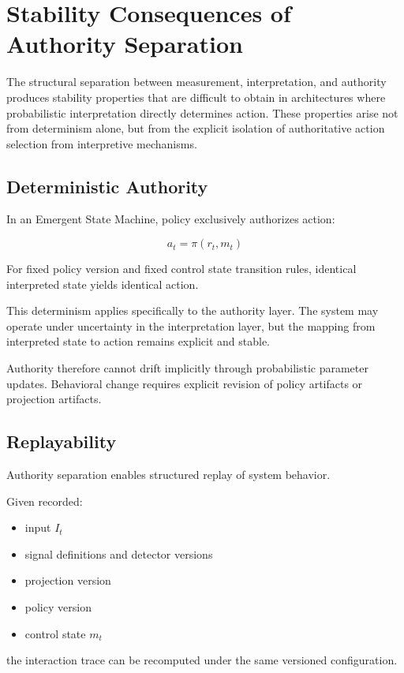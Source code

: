 \documentclass[11pt]{article}
\begin{document}
\section{Stability Consequences of Authority Separation}

The structural separation between measurement, interpretation, and authority produces stability properties that are difficult to obtain in architectures where probabilistic interpretation directly determines action. These properties arise not from determinism alone, but from the explicit isolation of authoritative action selection from interpretive mechanisms.

\subsection{Deterministic Authority}

In an Emergent State Machine, policy exclusively authorizes action:

\[
a_t = \pi(r_t, m_t)
\]

For fixed policy version and fixed control state transition rules, identical interpreted state yields identical action.

This determinism applies specifically to the authority layer. The system may operate under uncertainty in the interpretation layer, but the mapping from interpreted state to action remains explicit and stable.

Authority therefore cannot drift implicitly through probabilistic parameter updates. Behavioral change requires explicit revision of policy artifacts or projection artifacts.

\subsection{Replayability}

Authority separation enables structured replay of system behavior.

Given recorded:

\begin{itemize}
  \item input $I_t$
  \item signal definitions and detector versions
  \item projection version
  \item policy version
  \item control state $m_t$
\end{itemize}

the interaction trace can be recomputed under the same versioned configuration.
\end{document}
